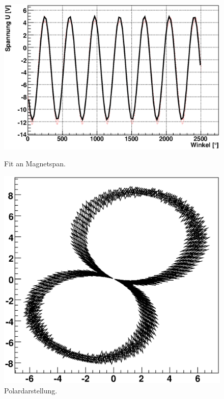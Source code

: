\documentclass[12pt]{article}
\begin{document}
\begin{figure}[H]  
\begin{minipage}{0.5\linewidth}
\centering
\includegraphics[width=0.9\linewidth]{pictures/magnetspan.eps}
\caption{Fit an Magnetspan.}
\end{minipage}
\begin{minipage}{0.5\linewidth}
\centering 
\includegraphics[width=0.9\linewidth]{pictures/magnetspanvd.eps}
\caption{Polardarstellung.}
\end{minipage}
\end{figure}
\end{document}
